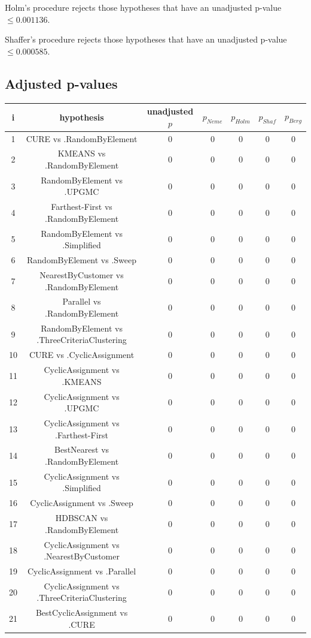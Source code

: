 \documentclass[a4paper,10pt]{article}
\begin{document}
\begin{landscape}
Holm's procedure rejects those hypotheses that have an unadjusted p-value $\le0.001136$.

Shaffer's procedure rejects those hypotheses that have an unadjusted p-value $\le0.000585$.

\pagebreak

\subsection{Adjusted p-values}

\begin{table}[!htp]
\centering\scriptsize
\begin{tabular}{ccccccc}
i&hypothesis&unadjusted $p$&$p_{Neme}$&$p_{Holm}$&$p_{Shaf}$&$p_{Berg}$\\
\hline1&CURE vs .RandomByElement&0&0&0&0&0\\
2&KMEANS vs .RandomByElement&0&0&0&0&0\\
3&RandomByElement vs .UPGMC&0&0&0&0&0\\
4&Farthest-First vs .RandomByElement&0&0&0&0&0\\
5&RandomByElement vs .Simplified&0&0&0&0&0\\
6&RandomByElement vs .Sweep&0&0&0&0&0\\
7&NearestByCustomer vs .RandomByElement&0&0&0&0&0\\
8&Parallel vs .RandomByElement&0&0&0&0&0\\
9&RandomByElement vs .ThreeCriteriaClustering&0&0&0&0&0\\
10&CURE vs .CyclicAssignment&0&0&0&0&0\\
11&CyclicAssignment vs .KMEANS&0&0&0&0&0\\
12&CyclicAssignment vs .UPGMC&0&0&0&0&0\\
13&CyclicAssignment vs .Farthest-First&0&0&0&0&0\\
14&BestNearest vs .RandomByElement&0&0&0&0&0\\
15&CyclicAssignment vs .Simplified&0&0&0&0&0\\
16&CyclicAssignment vs .Sweep&0&0&0&0&0\\
17&HDBSCAN vs .RandomByElement&0&0&0&0&0\\
18&CyclicAssignment vs .NearestByCustomer&0&0&0&0&0\\
19&CyclicAssignment vs .Parallel&0&0&0&0&0\\
20&CyclicAssignment vs .ThreeCriteriaClustering&0&0&0&0&0\\
21&BestCyclicAssignment vs .CURE&0&0&0&0&0\\

\end{tabular}
\end{table}
\end{landscape}
\end{document}
